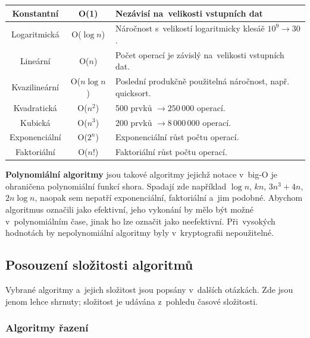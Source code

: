 \begin{table}[h]
	\begin{tabularx}{\textwidth}{|c|c|X|}\hline
		Konstantní    & O(1)          & Nezávisí na~velikosti vstupních dat                              \\\hline
		Logaritmická  & O($\log{n}$)  & Náročnost s~velikostí logaritmicky klesáě $10^9 \rightarrow 30$. \\\hline
		Lineární      & O($n$)        & Počet operací je závislý na~velikosti vstupních dat.             \\\hline
		Kvazilineární & O($n\log{n}$) & Poslední produkčně použitelná náročnost, např. quicksort.        \\\hline
		Kvadratická   & O($n^2$)      & 500 prvků $\rightarrow 250\,000$ operací.                        \\\hline
		Kubická       & O($n^3$)      & 200 prvků $\rightarrow 8\,000\,000$ operací.                     \\\hline
		Exponenciální & O($2^n$)      & Exponenciální růst počtu operací.                                \\\hline
		Faktoriální   & O($n!$)       & Faktoriální růst počtu operací.                                  \\\hline
	\end{tabularx}
\end{table}

\textbf{Polynomiální algoritmy} jsou takové algoritmy jejichž notace v~big-O je ohraničena polynomiální funkcí shora. Spadají zde například \( \log{n} \), \( kn \), \( 3n^3 + 4n \), \( 2n\log{n} \), naopak sem nepatří exponenciální, faktoriální a~jim podobné. Abychom algoritmus označili jako efektivní, jeho vykonání by mělo být možné v~polynomiálním čase, jinak ho lze označit jako neefektivní. Při~vysokých hodnotách by nepolynomiální algoritmy byly v~kryptografii nepoužitelné.

\subsection{Posouzení složitosti algoritmů}

Vybrané algoritmy a~jejich složitost jsou popsány v~dalších otázkách. Zde jsou jenom lehce shrnuty; složitost je udávána z~pohledu časové složitosti.

\subsubsection{Algoritmy řazení}

